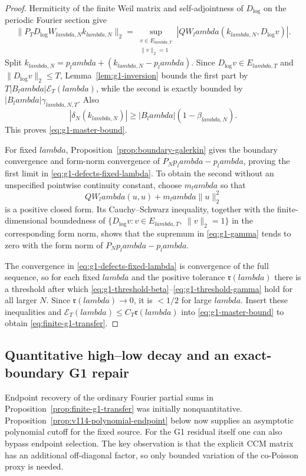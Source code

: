 \documentclass[11pt]{article}
\def\lambda{lambda}%
\theoremstyle{remark}
\begin{document}
\begin{proof}
Hermiticity of the finite Weil matrix and self-adjointness of $D_{\log}$ on the
periodic Fourier section give
\[
 \|P_TD_{\log}W_{\lambda,N}k_{\lambda,N}\|_2
 =\sup_{\substack{v\in E_{\lambda,T}\\\|v\|_2=1}}
 |QW_\lambda(k_{\lambda,N},D_{\log}v)|.
\]
Split $k_{\lambda,N}=p_\lambda+(k_{\lambda,N}-p_\lambda)$.  Since
$D_{\log}v\in E_{\lambda,T}$ and
$\|D_{\log}v\|_2\le T$, Lemma~\ref{lem:g1-inversion} bounds the first part by
$T|B_\lambda|\mathcal E_T(\lambda)$, while the second is exactly bounded by
$|B_\lambda|\gamma_{\lambda,N,T}$.  Also
\[
 |\delta_N(k_{\lambda,N})|
 \ge |B_\lambda|(1-\beta_{\lambda,N}).
\]
This proves \eqref{eq:g1-master-bound}.

For fixed $\lambda$, Proposition~\ref{prop:boundary-galerkin} gives the boundary
convergence and form-norm convergence of $P_Np_\lambda-p_\lambda$, proving the
first limit in \eqref{eq:g1-defects-fixed-lambda}.  To obtain the second without
an unspecified pointwise continuity constant, choose $m_\lambda$ so that
\[
 QW_\lambda(u,u)+m_\lambda\|u\|_2^2
\]
is a positive closed form.  Its Cauchy--Schwarz inequality, together with the
finite-dimensional boundedness of
$\{D_{\log}v:v\in E_{\lambda,T},\ \|v\|_2=1\}$ in the corresponding form norm,
shows that the supremum in \eqref{eq:g1-gamma} tends to zero with the form norm
of $P_Np_\lambda-p_\lambda$.

The convergence in \eqref{eq:g1-defects-fixed-lambda} is convergence of the
full sequence, so for each fixed $\lambda$ and the positive tolerance
$\mathfrak r(\lambda)$ there is a threshold after which
\eqref{eq:g1-threshold-beta}--\eqref{eq:g1-threshold-gamma} hold for all larger
$N$.  Since $\mathfrak r(\lambda)\to0$, it is $<1/2$ for large $\lambda$.
Insert these inequalities and
$\mathcal E_T(\lambda)\le C_T\mathfrak r(\lambda)$ into
\eqref{eq:g1-master-bound} to obtain \eqref{eq:finite-g1-transfer}.
\end{proof}


\subsection{Quantitative high--low decay and an exact-boundary G1 repair}
Endpoint recovery of the ordinary Fourier partial sums in
Proposition~\ref{prop:finite-g1-transfer} was initially nonquantitative.
Proposition~\ref{prop:v114-polynomial-endpoint} below now supplies an
asymptotic polynomial cutoff for the fixed source. For the G1
residual itself one can also bypass endpoint selection.  The key observation is that the
explicit CCM matrix has an additional off-diagonal factor, so only bounded
variation of the co-Poisson proxy is needed.
\end{document}

